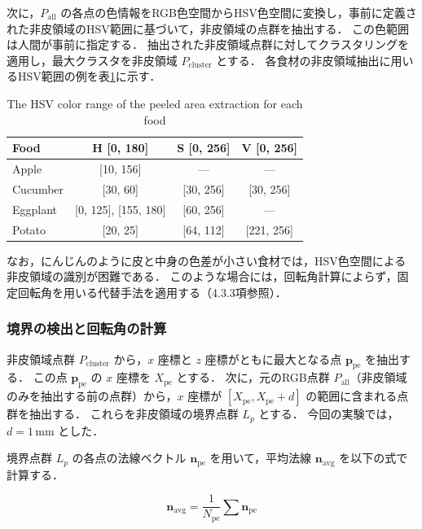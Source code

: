 次に，$P_{\mathrm{all}}$ の各点の色情報をRGB色空間からHSV色空間に変換し，事前に定義された非皮領域のHSV範囲に基づいて，非皮領域の点群を抽出する．
この色範囲は人間が事前に指定する．
抽出された非皮領域点群に対してクラスタリングを適用し，最大クラスタを非皮領域 $P_{\mathrm{cluster}}$ とする．
各食材の非皮領域抽出に用いるHSV範囲の例を表\ref{tab:peeling_hsv_range}に示す．

\begin{table}[ht]
  \centering
  \caption{The HSV color range of the peeled area extraction for each food}
  \label{tab:peeling_hsv_range}
  \begin{tabular}{@{}lccc@{}}
    \toprule
    Food & H [0, 180] & S [0, 256] & V [0, 256] \\
    \midrule
    Apple & [10, 156] & --- & --- \\
    Cucumber & [30, 60] & [30, 256] & [30, 256] \\
    Eggplant & [0, 125], [155, 180] & [60, 256] & --- \\
    Potato & [20, 25] & [64, 112] & [221, 256] \\
    \bottomrule
  \end{tabular}
\end{table}

なお，にんじんのように皮と中身の色差が小さい食材では，HSV色空間による非皮領域の識別が困難である．
このような場合には，回転角計算によらず，固定回転角を用いる代替手法を適用する（4.3.3項参照）．

\subsubsection{境界の検出と回転角の計算}

非皮領域点群 $P_{\mathrm{cluster}}$ から，$x$ 座標と $z$ 座標がともに最大となる点 $\mathbf{p}_{\mathrm{pe}}$ を抽出する．
この点 $\mathbf{p}_{\mathrm{pe}}$ の $x$ 座標を $X_{\mathrm{pe}}$ とする．
次に，{元のRGB点群 $P_{\mathrm{all}}$}（非皮領域のみを抽出する前の点群）から，$x$ 座標が $[X_{\mathrm{pe}}, X_{\mathrm{pe}} + d]$ の範囲に含まれる点群を抽出する．
これらを非皮領域の境界点群 $L_p$ とする．
今回の実験では，$d = 1$\,mm とした．

境界点群 $L_p$ の各点の法線ベクトル $\mathbf{n}_{\mathrm{pe}}$ を用いて，平均法線 $\mathbf{n}_{\mathrm{avg}}$ を以下の式で計算する．

\begin{equation}
  \mathbf{n}_{\mathrm{avg}} = \frac{1}{N_{\mathrm{pe}}} \sum \mathbf{n}_{\mathrm{pe}}
  \label{eq:peeling_avg_normal}
\end{equation}

